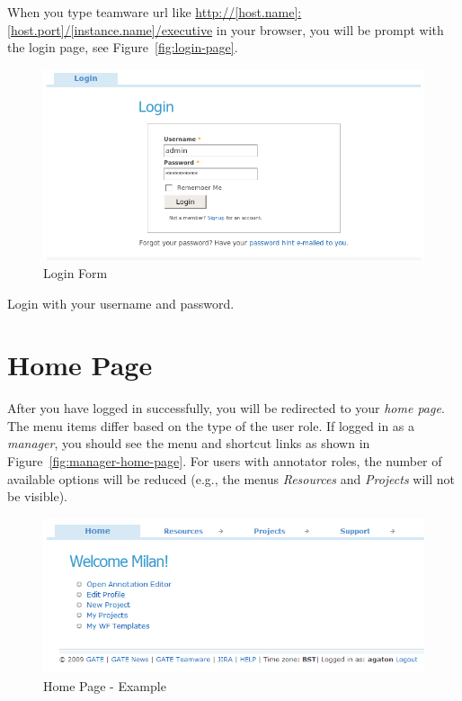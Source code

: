 When you type teamware url like
\url{http://[host.name]:[host.port]/[instance.name]/executive} in your browser, you will be prompt with the login page, see Figure~\ref{fig:login-page}.

\begin{figure}[htb]
\centering
\includegraphics[scale=0.5]{login}
\caption{Login Form}\label{fig:login-page}
\label{fig:login}
\end{figure}

Login with your username and password.

\section{Home Page}
After you have logged in successfully, you will be redirected to your
\emph{home page}. The menu items differ based on the type of the user role. If
logged in as a \emph{manager}, you should see the menu and shortcut links as
shown in Figure~\ref{fig:manager-home-page}. For users with annotator roles,
the number of available options will be reduced (e.g., the menus
\emph{Resources} and \emph{Projects} will not be visible).
\begin{figure}[htb!]
\centering
\includegraphics[scale=0.5]{main}
\caption{Home Page - Example}
\label{fig:main}
\end{figure}


